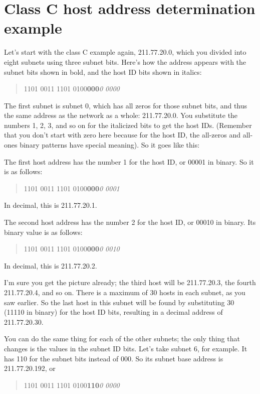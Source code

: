 \section{Class C host address determination example}

Let's start with the class C example again, 211.77.20.0, which you divided into eight subnets using three subnet bits.
Here's how the address appears with the subnet bits shown in bold, and the host ID bits shown in italics:

\begin{quote}
1101 0011 1101 0100\quad \textbf{000}\textit{0 0000}
\end{quote}

The first subnet is subnet 0, which has all zeros for those subnet bits,
and thus the same address as the network as a whole: 211.77.20.0. You
substitute the numbers 1, 2, 3, and so on for the italicized bits to get
the host IDs. (Remember that you don't start with zero here because for
the host ID, the all-zeros and all-ones binary patterns have special
meaning). So it goes like this:

The first host address has the number 1 for the host ID, or 00001 in binary.
So it is as follows:
\begin{quote}
1101 0011 1101 0100\quad \textbf{000}\textit{0 0001}
\end{quote}
In decimal, this is 211.77.20.1.

The second host address has the number 2 for the host ID, or 00010 in binary.
Its binary value is as follows:
\begin{quote}
1101 0011 1101 0100\quad \textbf{000}\textit{0 0010}
\end{quote}
In decimal, this is 211.77.20.2.

I'm sure you get the picture already; the third host will be 211.77.20.3, the fourth 211.77.20.4, and so on.
There is a maximum of 30 hosts in each subnet, as you saw earlier.
So the last host in this subnet will be found by substituting 30 (11110 in binary) for the host ID bits, resulting in a decimal address of 211.77.20.30.

You can do the same thing for each of the other subnets; the only thing that changes is the values in the subnet ID bits.
Let's take subnet 6, for example.
It has 110 for the subnet bits instead of 000.
So its subnet base address is 211.77.20.192, or
\begin{quote}
1101 0011 1101 0100\quad \textbf{110}\textit{0 0000}
\end{quote}

